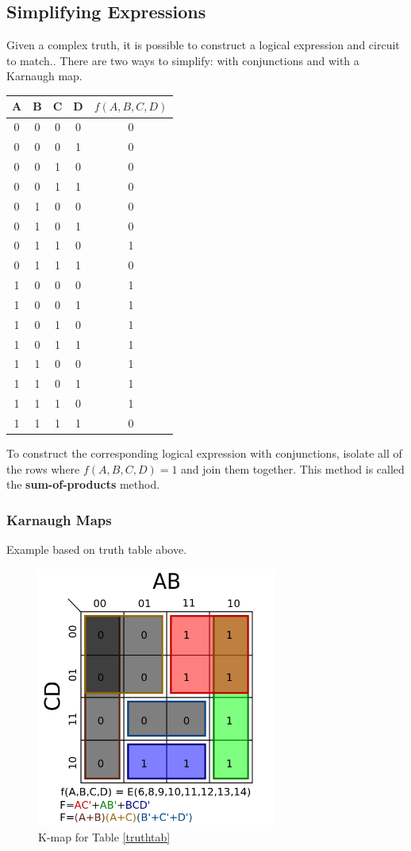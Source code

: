 \documentclass[11pt]{article}
\begin{document}
	\subsection{Simplifying Expressions}
		Given a complex truth, it is possible to construct a logical expression and circuit to match.. There are two ways to simplify: with conjunctions and with a Karnaugh map.
		\begin{center}
		\begin{tabular}{cccc|c}\label{truthtab}
			A&B&C&D&$f(A,B,C,D)$\\\hline
			0&0&0&0&0\\
			0&0&0&1&0\\
			0&0&1&0&0\\
			0&0&1&1&0\\
			0&1&0&0&0\\
			0&1&0&1&0\\
			0&1&1&0&1\\
			0&1&1&1&0\\
			1&0&0&0&1\\
			1&0&0&1&1\\
			1&0&1&0&1\\
			1&0&1&1&1\\
			1&1&0&0&1\\
			1&1&0&1&1\\
			1&1&1&0&1\\
			1&1&1&1&0
		\end{tabular}
		\end{center}
	
		To construct the corresponding logical expression with conjunctions, isolate all of the rows where $f(A,B,C,D) = 1$ and join them together. This method is called the \textbf{sum-of-products} method. 
		\subsubsection{Karnaugh Maps}
			Example based on truth table above.
			
			\begin{figure}[htb]
				\centering
				\includegraphics[width=0.7\textwidth]{kmap.png}
				\caption{K-map for Table \ref{truthtab}}
				\label{fig:kmap1}
			\end{figure}
			
\end{document}
